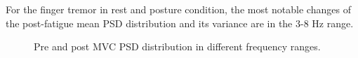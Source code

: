 \documentclass[conference, a4paper]{IEEEtran}
\begin{document}
For the finger tremor in rest and posture condition, the most notable changes of the post-fatigue mean PSD distribution and its variance are in the 3-8 Hz range.
%
\begin{figure}[h!]
	\centering
	\label{fig:finger_PC_30MVC}
	\hfill
	\label{fig:finger_RC_30MVC}
	\hfill
	\label{fig:finger_LPC_30MVC}
	\caption{Pre and post MVC PSD distribution in different frequency ranges.}
	\label{fig:MVC}
\end{figure}
\end{document}
